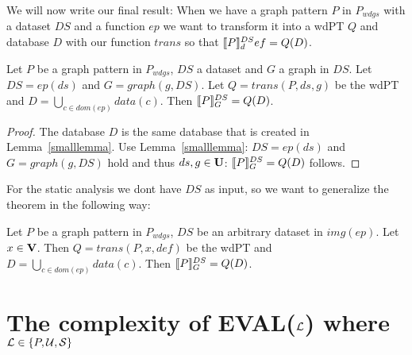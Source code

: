 We will now write our final result: When we have a graph pattern $P$ in
$P_{wdgs}$ with a dataset $DS$ and a function $ep$ we want to transform it into a
wdPT $Q$ and database $D$ with our function $trans$ so that
$\llbracket P \rrbracket^{DS}_def = Q(D)$.
\begin{theorem}\label{biglemma}
    Let $P$ be a graph pattern in $P_{wdgs}$, $DS$ a dataset and $G$ a graph in $DS$.
    Let $DS = ep(ds)$  and $G = graph(g,DS)$. Let $Q = trans(P,ds,g)$ be the
    wdPT and $D = \bigcup\limits_{c \in dom(ep)} data(c)$. Then $\llbracket P \rrbracket^{DS}_G = Q(D)$.
\end{theorem}
\begin{proof}
	The database $D$ is the same database that is created in
	Lemma~\ref{smalllemma}.
	Use Lemma~\ref{smalllemma}: 
	$DS = ep(ds)$  and $G = graph(g,DS)$ hold and thus $ds,g \in \mathbf{U}$:
	$\llbracket P \rrbracket^{DS}_G = Q(D)$ follows.
\end{proof}

For the static analysis we dont have $DS$ as input, so we want to
generalize the theorem in the following way:
\begin{theorem}\label{biglemma}
	Let $P$ be a graph pattern in $P_{wdgs}$, 
	$DS$ be an arbitrary dataset in $img(ep)$.
	Let $x \in \mathbf{V}$. Then $Q = trans(P,x,def)$ be the wdPT and 
	$D = \bigcup\limits_{c \in dom(ep)} data(c)$. 
	Then $\llbracket P \rrbracket^{DS}_G = Q(D)$.
\end{theorem}

\section{The complexity of EVAL($\mathcal{L}$) where $\mathcal{L} \in \{P,\mathcal{U},\mathcal{S}\}$ }

